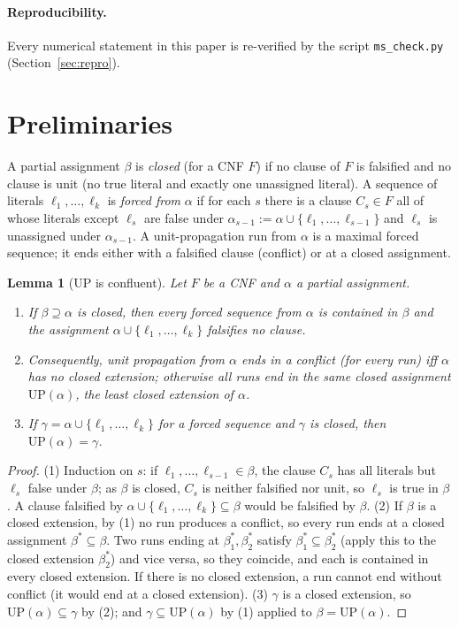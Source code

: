 \documentclass[11pt]{article}
\newtheorem{lemma}{Lemma}
\theoremstyle{definition}
\theoremstyle{remark}
\newcommand{\UP}{\mathrm{UP}}
\begin{document}
\paragraph{Reproducibility.} Every numerical statement in this paper is re-verified by the script
\texttt{ms\_check.py} (Section~\ref{sec:repro}).

\section{Preliminaries}\label{sec:prelim}

A partial assignment $\beta$ is \emph{closed} (for a CNF $F$) if no clause of $F$ is falsified and no
clause is unit (no true literal and exactly one unassigned literal). A sequence of literals
$\ell_1,\dots,\ell_k$ is \emph{forced from} $\alpha$ if for each $s$ there is a clause $C_s\in F$
all of whose literals except $\ell_s$ are false under $\alpha_{s-1}:=\alpha\cup\{\ell_1,\dots,\ell_{s-1}\}$
and $\ell_s$ is unassigned under $\alpha_{s-1}$. A unit-propagation run from $\alpha$ is a maximal
forced sequence; it ends either with a falsified clause (conflict) or at a closed assignment.

\begin{lemma}[UP is confluent]\label{lem:conf}
Let $F$ be a CNF and $\alpha$ a partial assignment.
\begin{enumerate}
\item If $\beta\supseteq\alpha$ is closed, then every forced sequence from $\alpha$ is contained in
  $\beta$ and the assignment $\alpha\cup\{\ell_1,\dots,\ell_k\}$ falsifies no clause.
\item Consequently, unit propagation from $\alpha$ ends in a conflict (for every run) iff $\alpha$
  has no closed extension; otherwise all runs end in the same closed assignment $\UP(\alpha)$,
  the least closed extension of $\alpha$.
\item If $\gamma=\alpha\cup\{\ell_1,\dots,\ell_k\}$ for a forced sequence and $\gamma$ is closed, then
  $\UP(\alpha)=\gamma$.
\end{enumerate}
\end{lemma}
\begin{proof}
(1) Induction on $s$: if $\ell_1,\dots,\ell_{s-1}\in\beta$, the clause $C_s$ has all literals but
$\ell_s$ false under $\beta$; as $\beta$ is closed, $C_s$ is neither falsified nor unit, so $\ell_s$
is true in $\beta$. A clause falsified by $\alpha\cup\{\ell_1,\dots,\ell_k\}\subseteq\beta$ would be
falsified by $\beta$.
(2) If $\beta$ is a closed extension, by (1) no run produces a conflict, so every run ends at a closed
assignment $\beta^*\subseteq\beta$. Two runs ending at $\beta^*_1,\beta^*_2$ satisfy
$\beta^*_1\subseteq\beta^*_2$ (apply this to the closed extension $\beta^*_2$) and vice versa, so they
coincide, and each is contained in every closed extension. If there is no closed extension, a run
cannot end without conflict (it would end at a closed extension).
(3) $\gamma$ is a closed extension, so $\UP(\alpha)\subseteq\gamma$ by (2); and $\gamma\subseteq\UP(\alpha)$
by (1) applied to $\beta=\UP(\alpha)$. \qedhere
\end{proof}
\end{document}

